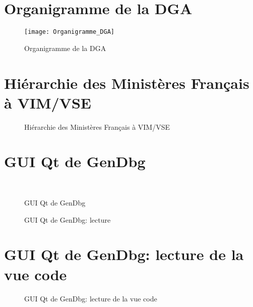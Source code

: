 \documentclass[11pt, book, english, french, standardlists]{upmethodology-document}
\begin{document}
		\section{Organigramme de la DGA}\label{sec:organigrammedga}
			\begin{figure}[H]
				\centering
				\texttt{[image: Organigramme\_DGA]}
				\caption{Organigramme de la DGA\cite{OrganigrammeDGA}}
				\label{fig:Organigramme_DGA}
			\end{figure}
		\newpage\section{Hiérarchie des Ministères Français à VIM/VSE}\label{sec:hierarchieministereavim}
			\begin{figure}[H]
				\centering
				\caption{Hiérarchie des Ministères Français à VIM/VSE}
				\label{fig:Hierarchie_Ministeres_a_VIM}
			\end{figure}
		\newpage\section{GUI Qt de GenDbg}\label{sec:guiqtgendbg}
			\begin{figure}[H]
				\hspace*{-1cm}
				\centering
				\\
				\caption{\acrshort{GUI} Qt de GenDbg}
				\label{fig:GenDbg_GUI_Qt}
			\end{figure}
			\begin{figure}[H]
				\hspace*{-1cm}
				\centering
				\caption{\acrshort{GUI} Qt de GenDbg: lecture}
				\label{fig:GenDbg_GUI_Qt_Annotations}
			\end{figure}
		\newpage\section{GUI Qt de GenDbg: lecture de la vue code}\label{sec:guiqtgendbgvuecode}
			\begin{figure}[H]
				\hspace*{-1cm}
				\centering
				\caption{\acrshort{GUI} Qt de GenDbg: lecture de la vue code}
				\label{fig:GenDbg_GUI_Qt_Vue_code_Annotations}
			\end{figure}
\end{document}
